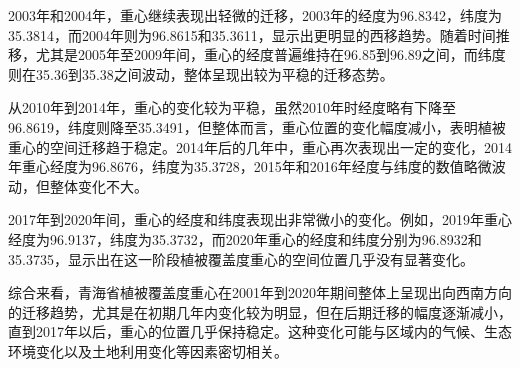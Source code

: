\documentclass[AutoFakeBold]{LZUThesis-PgD&PhD}
\begin{document}
		2003年和2004年，重心继续表现出轻微的迁移，2003年的经度为96.8342，纬度为35.3814，而2004年则为96.8615和35.3611，显示出更明显的西移趋势。随着时间推移，尤其是2005年至2009年间，重心的经度普遍维持在96.85到96.89之间，而纬度则在35.36到35.38之间波动，整体呈现出较为平稳的迁移态势。
		
		从2010年到2014年，重心的变化较为平稳，虽然2010年时经度略有下降至96.8619，纬度则降至35.3491，但整体而言，重心位置的变化幅度减小，表明植被重心的空间迁移趋于稳定。2014年后的几年中，重心再次表现出一定的变化，2014年重心经度为96.8676，纬度为35.3728，2015年和2016年经度与纬度的数值略微波动，但整体变化不大。
		
		2017年到2020年间，重心的经度和纬度表现出非常微小的变化。例如，2019年重心经度为96.9137，纬度为35.3732，而2020年重心的经度和纬度分别为96.8932和35.3735，显示出在这一阶段植被覆盖度重心的空间位置几乎没有显著变化。
		
		综合来看，青海省植被覆盖度重心在2001年到2020年期间整体上呈现出向西南方向的迁移趋势，尤其是在初期几年内变化较为明显，但在后期迁移的幅度逐渐减小，直到2017年以后，重心的位置几乎保持稳定。这种变化可能与区域内的气候、生态环境变化以及土地利用变化等因素密切相关。
\end{document}

